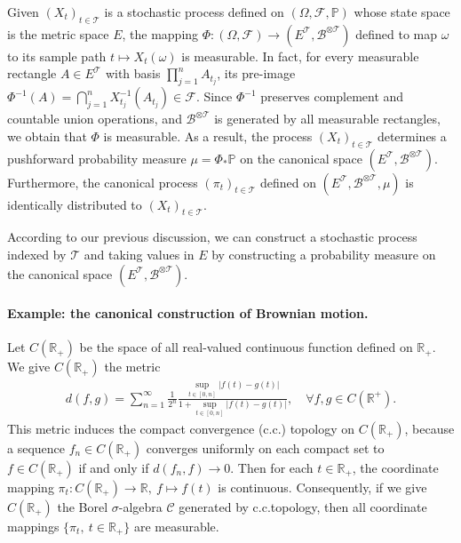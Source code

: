 \documentclass{article}
\numberwithin{equation}{section}
\renewcommand{\P}{\mathbb{P}}
\theoremstyle{plain}
\theoremstyle{definition}
\begin{document}
Given $(X_t)_{t\in\mathcal{T}}$ is a stochastic process defined on $(\Omega,\mathscr{F},\P)$ whose state space is the metric space $E$, the mapping $\Phi:(\Omega,\mathscr{F})\to(E^\mathcal{T},\mathscr{B}^{\otimes\mathcal{T}})$ defined to map $\omega$ to its sample path $t\mapsto X_t(\omega)$ is measurable. In fact, for every measurable rectangle $A\in E^\mathcal{T}$ with basis $\prod_{j=1}^n A_{t_j}$, its pre-image $\Phi^{-1}(A)=\bigcap_{j=1}^n X_{t_j}^{-1}(A_{t_j})\in\mathscr{F}$. Since $\Phi^{-1}$ preserves complement and countable union operations, and $\mathscr{B}^{\otimes\mathcal{T}}$ is generated by all measurable rectangles, we obtain that $\Phi$ is measurable. As a result, the process $(X_t)_{t\in\mathcal{T}}$ determines a pushforward probability measure $\mu=\Phi_*\P$ on the canonical space $(E^\mathcal{T},\mathscr{B}^{\otimes\mathcal{T}})$. Furthermore, the canonical process $(\pi_t)_{t\in\mathcal{T}}$ defined on $(E^\mathcal{T},\mathscr{B}^{\otimes\mathcal{T}},\mu)$ is identically distributed to $(X_t)_{t\in\mathcal{T}}$.

According to our previous discussion, we can construct a stochastic process indexed by $\mathcal{T}$ and taking values in $E$ by constructing a probability measure on the canonical space $(E^\mathcal{T},\mathscr{B}^{\otimes\mathcal{T}})$.

\paragraph{Example: the canonical construction of Brownian motion.} Let $C(\mathbb{R}_+)$ be the space of all real-valued continuous function defined on $\mathbb{R}_+$. We give $C(\mathbb{R}_+)$ the metric
\begin{align*}
d(f,g)=\sum_{n=1}^\infty\frac{1}{2^n}\frac{\sup_{t\in[0,n]}\vert f(t)-g(t)\vert}{1+\sup_{t\in[0,n]}\vert f(t)-g(t)\vert},\quad \forall f,g\in C(\mathbb{R}^+).
\end{align*}
This metric induces the compact convergence (c.c.) topology on $C(\mathbb{R}_+)$, because a sequence $f_n\in C(\mathbb{R}_+)$ converges uniformly on each compact set to $f\in C(\mathbb{R}_+)$ if and only if $d(f_n,f)\to 0$. Then for each $t\in\mathbb{R}_+$, the coordinate mapping $\pi_t:C(\mathbb{R}_+)\to\mathbb{R},\ f\mapsto f(t)$ is continuous. Consequently, if we give $C(\mathbb{R}_+)$ the Borel $\sigma$-algebra $\mathscr{C}$ generated by c.c.topology, then all coordinate mappings $\{\pi_t,\ t\in\mathbb{R}_+\}$ are measurable.
\end{document}
